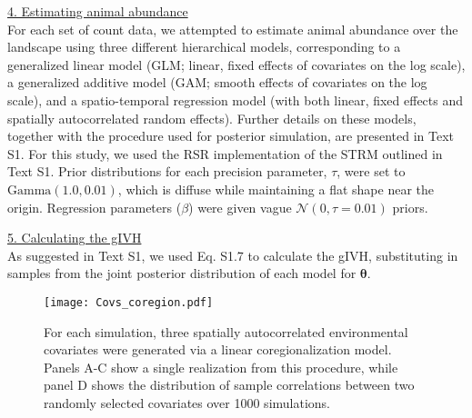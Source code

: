 \documentclass[12pt,fleqn]{article}
\begin{document}
\begin{flushleft}
\underline{4. Estimating animal abundance} \\

For each set of count data, we attempted to estimate animal abundance over the landscape using three different hierarchical models, corresponding to a generalized linear model (GLM; linear, fixed effects of covariates on the log scale), a generalized additive model (GAM; smooth effects of covariates on the log scale), and a spatio-temporal regression model (with both linear, fixed effects and spatially autocorrelated random effects).  Further details on these models, together with the procedure used for posterior simulation, are presented in Text S1.  For this study, we used the RSR implementation of the STRM outlined in Text S1.  Prior distributions for each precision parameter, $\tau$, were set to $\text{Gamma}(1.0,0.01)$, which is diffuse while maintaining a flat shape near the origin.  Regression parameters ($\beta$) were given vague $\mathcal{N}(0,\tau=0.01)$ priors.


\underline{5. Calculating the gIVH} \\

As suggested in Text S1, we used Eq. S1.7 to calculate the gIVH, substituting in samples from the joint posterior distribution of each model for $\boldsymbol{\theta}$.


\renewcommand{\refname}{Literature Cited}




\end{flushleft}


\begin{figure}[!h]
\begin{center}
\texttt{[image: Covs\_coregion.pdf]}
\end{center}
\caption{For each simulation, three spatially autocorrelated environmental covariates were generated via a linear coregionalization model.  Panels A-C show a single realization from this procedure, while panel D shows the distribution of sample correlations between two randomly selected covariates over 1000 simulations.}
\label{fig:covs}
\end{figure}
\end{document}
